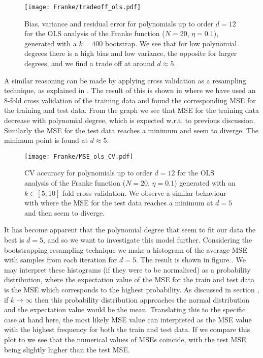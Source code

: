             
            \begin{figure}
                \texttt{[image: Franke/tradeoff\_ols.pdf]}
                \caption{Bias, variance and residual error for polynomials up to order $d=12$ for the OLS analysis of the Franke function ($N=20$, $\eta=0.1$), generated with a $k=400$ bootstrap. We see that for low polynomial degrees there is a high bias and low variance, the opposite for larger degrees, and we find a trade off at around $d\approx 5$.}
                \label{fig:bias_variance_ols}
            \end{figure}
            
            
            A similar reasoning can be made by applying cross validation as a resampling technique, as explained in . The result of this is shown in  where we have used an 8-fold cross validation of the training data and found the corresponding MSE for the training and test data. From the graph we see that MSE for the training data decrease with polynomial degree, which is expected w.r.t. to previous discussion. Similarly the MSE for the test data reaches a minimum and seem to diverge. The minimum point is found at $d\approx 5$.

            \begin{figure}
                \texttt{[image: Franke/MSE\_ols\_CV.pdf]}
                \caption{CV accuracy for polynomials up to order $d=12$ for the OLS analysis of the Franke function ($N=20$, $\eta=0.1$) generated with an $k\in[5,10]$-fold cross validation. We observe a similar behaviour with  where the MSE for the test data reaches a minimum at $d=5$ and then seem to diverge. }
                \label{fig:cross-validation_ols}
            \end{figure} 
            
            It has become apparent that the polynomial degree that seem to fit our data the best is $d=5$, and so we want to investigate this model further. Considering the bootstrapping resampling technique we make a histogram of the average MSE with samples from each iteration for $d=5$. The  result is shown  in figure . We may interpret these histograms (if they were to be normalised) as a probability distribution, where the expectation value of the MSE for the train and test data is the MSE which corresponds to the highest probability. As discussed in section , if $k\to\infty$ then this probability distribution approaches the normal distribution and the expectation value would be the mean. Translating this to the specific case at hand here, the most likely MSE value can interpreted as the MSE value with the highest frequency for both the train and test data. If we compare this plot to  we see that the numerical values of MSEs coincide, with the test MSE being slightly higher than the test MSE. 

